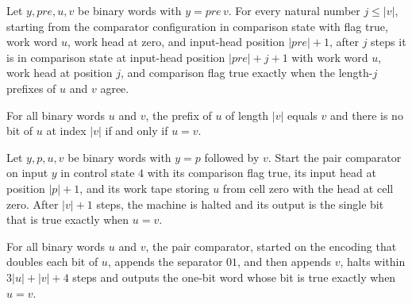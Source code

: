 \begin{lemma}
\label{Complexity.a3n_eq_scan}
\leanok
{}
Let $y,pre,u,v$ be binary words with $y=pre\,v$. For every natural number $j\le |v|$,
starting from the comparator configuration in comparison state with flag true, work word
$u$, work head at zero, and input-head position $|pre|+1$, after $j$ steps it is in
comparison state at input-head position $|pre|+j+1$ with work word $u$, work head at
position $j$, and comparison flag true exactly when the length-$j$ prefixes of $u$ and
$v$ agree.
\end{lemma}

\begin{lemma}
\label{Complexity.a3n_eq_end}
\leanok
{}
For all binary words $u$ and $v$, the prefix of $u$ of length $|v|$ equals $v$ and there
is no bit of $u$ at index $|v|$ if and only if $u=v$.
\end{lemma}

\begin{lemma}
\label{Complexity.a3n_eq_compare}
\leanok
{}
Let $y,p,u,v$ be binary words with $y=p$ followed by $v$. Start the pair comparator on
input $y$ in control state $4$ with its comparison flag true, its input head at position
$|p|+1$, and its work tape storing $u$ from cell zero with the head at cell zero. After
$|v|+1$ steps, the machine is halted and its output is the single bit that is true
exactly when $u=v$.
\end{lemma}

\begin{lemma}
\label{Complexity.a3n_eq_computes}
\leanok
{}
For all binary words $u$ and $v$, the pair comparator, started on the encoding that
doubles each bit of $u$, appends the separator $01$, and then appends $v$, halts within
$3|u|+|v|+4$ steps and outputs the one-bit word whose bit is true exactly when $u=v$.
\end{lemma}

